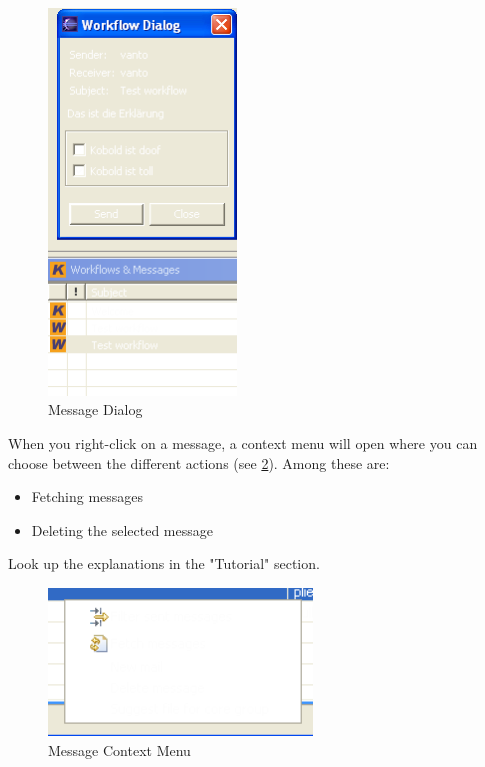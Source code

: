 \begin{figure}[h!]
\begin{center}
\includegraphics[width=5cm]{workflowdialog.png}
   \caption{Message Dialog}
\label{workflowdialog}
\end{center}
\end{figure}\par

When you right-click on a message, a context menu will open where you can choose 
between the different actions (see \ref{workflowkontext}). Among these are:

\begin{itemize}
	\item Fetching messages
	\item Deleting the selected message
\end{itemize}
Look up the explanations in the "Tutorial" section.

\begin{figure}[h!]
\begin{center}
\includegraphics[width=7cm]{workflowkontext.png}
   \caption{Message Context Menu}
\label{workflowkontext}
\end{center}
\end{figure}\par

